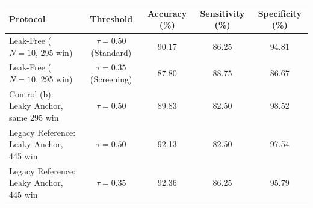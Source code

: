 \begin{tabular}{lcccc}
\toprule
\textbf{Protocol} & \textbf{Threshold} & \textbf{Accuracy (\%)} & \textbf{Sensitivity (\%)} & \textbf{Specificity (\%)} \\
\midrule
Leak-Free ($N=10$, 295 win) & $\tau = 0.50$ (Standard) & 90.17 & 86.25 & 94.81 \\
Leak-Free ($N=10$, 295 win) & $\tau = 0.35$ (Screening) & 87.80 & 88.75 & 86.67 \\
\midrule
Control (b): Leaky Anchor, same 295 win & $\tau = 0.50$ & 89.83 & 82.50 & 98.52 \\
Legacy Reference: Leaky Anchor, 445 win & $\tau = 0.50$ & 92.13 & 82.50 & 97.54 \\
Legacy Reference: Leaky Anchor, 445 win & $\tau = 0.35$ & 92.36 & 86.25 & 95.79 \\
\bottomrule
\end{tabular}
